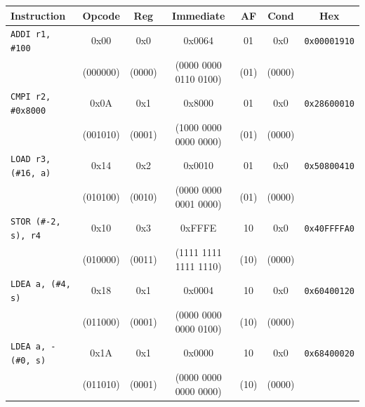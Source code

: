 \begin{table}[H]
	\centering
	\small
	\begin{tabular}{lcccccc}
		\toprule
		\textbf{Instruction}          & \textbf{Opcode} & \textbf{Reg} & \textbf{Immediate}    & \textbf{AF} & \textbf{Cond} & \textbf{Hex}        \\
		\midrule
		\texttt{ADDI r1, \#100}       & 0x00            & 0x0          & 0x0064                & 01          & 0x0           & \texttt{0x00001910} \\
		                              & (000000)        & (0000)       & (0000 0000 0110 0100) & (01)        & (0000)        &                     \\
		\midrule
		\texttt{CMPI r2, \#0x8000}    & 0x0A            & 0x1          & 0x8000                & 01          & 0x0           & \texttt{0x28600010} \\
		                              & (001010)        & (0001)       & (1000 0000 0000 0000) & (01)        & (0000)        &                     \\
		\midrule
		\texttt{LOAD r3, (\#16, a)}   & 0x14            & 0x2          & 0x0010                & 01          & 0x0           & \texttt{0x50800410} \\
		                              & (010100)        & (0010)       & (0000 0000 0001 0000) & (01)        & (0000)        &                     \\
		\midrule
		\texttt{STOR (\#-2, s), r4}   & 0x10            & 0x3          & 0xFFFE                & 10          & 0x0           & \texttt{0x40FFFFA0} \\
		                              & (010000)        & (0011)       & (1111 1111 1111 1110) & (10)        & (0000)        &                     \\
		\midrule
		\texttt{LDEA a, (\#4, s)}     & 0x18            & 0x1          & 0x0004                & 10          & 0x0           & \texttt{0x60400120} \\
		                              & (011000)        & (0001)       & (0000 0000 0000 0100) & (10)        & (0000)        &                     \\
		\midrule
		\texttt{LDEA a, -(\#0, s)}    & 0x1A            & 0x1          & 0x0000                & 10          & 0x0           & \texttt{0x68400020} \\
		                              & (011010)        & (0001)       & (0000 0000 0000 0000) & (10)        & (0000)        &                     \\

\end{tabular}
\end{table}
